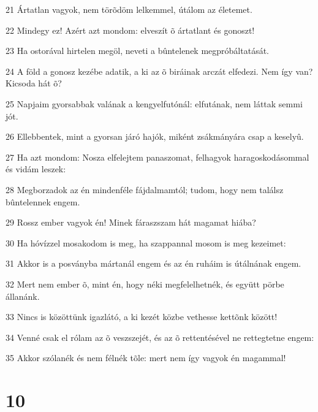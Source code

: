 \par 21 Ártatlan vagyok, nem törõdöm lelkemmel, útálom az életemet.
\par 22 Mindegy ez! Azért azt mondom: elveszít õ ártatlant és gonoszt!
\par 23 Ha ostorával hirtelen megöl, neveti a bûntelenek megpróbáltatását.
\par 24 A föld a gonosz kezébe adatik, a ki az õ biráinak arczát elfedezi. Nem így van? Kicsoda hát õ?
\par 25 Napjaim gyorsabbak valának a kengyelfutónál: elfutának, nem láttak semmi jót.
\par 26 Ellebbentek, mint a gyorsan járó hajók, miként zsákmányára csap a keselyû.
\par 27 Ha azt mondom: Nosza elfelejtem panaszomat, felhagyok haragoskodásommal és vidám leszek:
\par 28 Megborzadok az én mindenféle fájdalmamtól; tudom, hogy nem találsz bûntelennek engem.
\par 29 Rossz ember vagyok én! Minek fáraszszam hát magamat hiába?
\par 30 Ha hóvízzel mosakodom is meg, ha szappannal mosom is meg kezeimet:
\par 31 Akkor is a posványba mártanál engem és az én ruháim is útálnának engem.
\par 32 Mert nem ember õ, mint én, hogy néki megfelelhetnék, és együtt pörbe állanánk.
\par 33 Nincs is közöttünk igazlátó, a ki kezét közbe vethesse kettõnk között!
\par 34 Venné csak el rólam az õ veszszejét, és az õ rettentésével ne rettegtetne engem:
\par 35 Akkor szólanék és nem félnék tõle: mert nem így vagyok én magammal!

\chapter{10}

